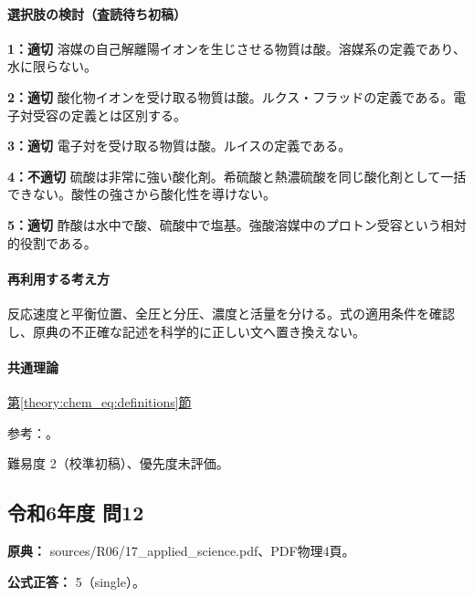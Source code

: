 \paragraph{選択肢の検討（査読待ち初稿）}\mbox{}\par

\noindent\textbf{1：適切} 溶媒の自己解離陽イオンを生じさせる物質は酸。溶媒系の定義であり、水に限らない。\par

\noindent\textbf{2：適切} 酸化物イオンを受け取る物質は酸。ルクス・フラッドの定義である。電子対受容の定義とは区別する。\par

\noindent\textbf{3：適切} 電子対を受け取る物質は酸。ルイスの定義である。\par

\noindent\textbf{4：不適切} 硫酸は非常に強い酸化剤。希硫酸と熱濃硫酸を同じ酸化剤として一括できない。酸性の強さから酸化性を導けない。\par

\noindent\textbf{5：適切} 酢酸は水中で酸、硫酸中で塩基。強酸溶媒中のプロトン受容という相対的役割である。\par

\paragraph{再利用する考え方} 反応速度と平衡位置、全圧と分圧、濃度と活量を分ける。式の適用条件を確認し、原典の不正確な記述を科学的に正しい文へ置き換えない。

\paragraph{共通理論} \hyperref[theory:chem_eq:definitions]{第\ref*{theory:chem_eq:definitions}節}

\par 参考：\cite{iupac_greenbook2012}。

\par 難易度 2（校準初稿）、優先度未評価。

\subsection{令和6年度 問12}
\label{q:r06-reg-applied-12}

\noindent\textbf{原典：} sources/R06/17\_applied\_science.pdf、PDF物理4頁。

\textbf{公式正答：} 5（single）。

